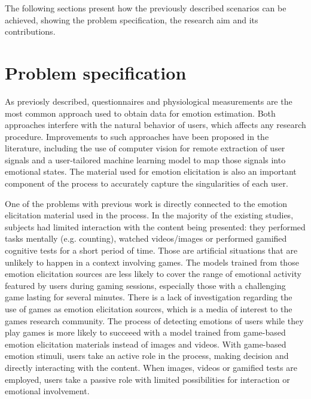 
The following sections present how the previously described scenarios can be achieved, showing the problem specification, the research aim and its contributions.

\section{Problem specification}

As previosly described, questionnaires and physiological measurements are the most common approach used to obtain data for emotion estimation. Both approaches interfere with the natural behavior of users, which affects any research procedure. Improvements to such approaches have been proposed in the literature, including the use of computer vision for remote extraction of user signals and a user-tailored machine learning model to map those signals into emotional states. The material used for emotion elicitation is also an important component of the process to accurately capture the singularities of each user.

One of the problems with previous work is directly connected to the emotion elicitation material used in the process. In the majority of the existing studies, subjects had limited interaction with the content being presented: they performed tasks mentally (e.g. counting), watched videos/images or performed gamified cognitive tests for a short period of time. Those are artificial situations that are unlikely to happen in a context involving games. The models trained from those emotion elicitation sources are less likely to cover the range of emotional activity featured by users during gaming sessions, especially those with a challenging game lasting for several minutes. There is a lack of investigation regarding the use of games as emotion elicitation sources, which is a media of interest to the games research community. The process of detecting emotions of users while they play games is more likely to succeeed with a model trained from game-based emotion elicitation materials instead of images and videos. With game-based emotion stimuli, users take an active role in the process, making decision and directly interacting with the content. When images, videos or gamified tests are employed, users take a passive role with limited possibilities for interaction or emotional involvement.


